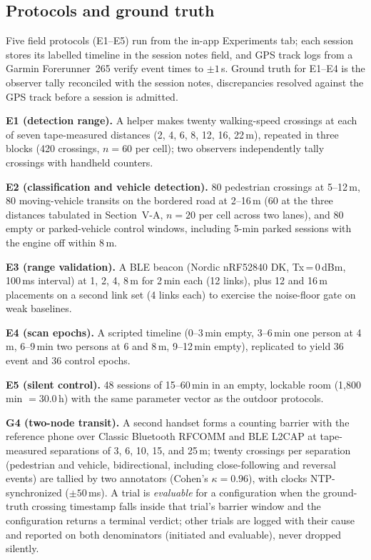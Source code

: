 \documentclass[journal,10pt]{IEEEtran}
\begin{document}
\subsection{Protocols and ground truth}
Five field protocols (E1--E5) run from the in-app Experiments tab; each
session stores its labelled timeline in the session notes field, and GPS track
logs from a Garmin Forerunner~265 verify event times to $\pm1$\,s. Ground
truth for E1--E4 is the observer tally reconciled with the session notes,
discrepancies resolved against the GPS track before a session is admitted.

\textbf{E1 (detection range).} A helper makes twenty walking-speed crossings
at each of seven tape-measured distances (2, 4, 6, 8, 12, 16, 22\,m), repeated
in three blocks (420 crossings, $n=60$ per cell); two observers independently
tally crossings with handheld counters.

\textbf{E2 (classification and vehicle detection).} 80 pedestrian crossings at
5--12\,m, 80 moving-vehicle transits on the bordered road at 2--16\,m (60 at
the three distances tabulated in Section~V-A, $n=20$ per cell across two
lanes), and 80 empty or parked-vehicle control windows, including 5-min parked
sessions with the engine off within 8\,m.

\textbf{E3 (range validation).} A BLE beacon (Nordic nRF52840 DK,
Tx\,=\,0\,dBm, 100\,ms interval) at 1, 2, 4, 8\,m for 2\,min each (12 links),
plus 12 and 16\,m placements on a second link set (4 links each) to exercise
the noise-floor gate on weak baselines.

\textbf{E4 (scan epochs).} A scripted timeline (0--3\,min empty, 3--6\,min one
person at 4\,m, 6--9\,min two persons at 6 and 8\,m, 9--12\,min empty),
replicated to yield 36 event and 36 control epochs.

\textbf{E5 (silent control).} 48 sessions of 15--60\,min in an empty, lockable
room (1{,}800\,min $=30.0$\,h) with the same parameter vector as the outdoor
protocols.

\textbf{G4 (two-node transit).} A second handset forms a counting barrier with
the reference phone over Classic Bluetooth RFCOMM and BLE L2CAP at
tape-measured separations of 3, 6, 10, 15, and 25\,m; twenty crossings per
separation (pedestrian and vehicle, bidirectional, including close-following
and reversal events) are tallied by two annotators (Cohen's $\kappa = 0.96$),
with clocks NTP-synchronized ($\pm50$\,ms). A trial is \emph{evaluable} for a
configuration when the ground-truth crossing timestamp falls inside that
trial's barrier window and the configuration returns a terminal verdict; other
trials are logged with their cause and reported on both denominators
(initiated and evaluable), never dropped silently.
\end{document}
